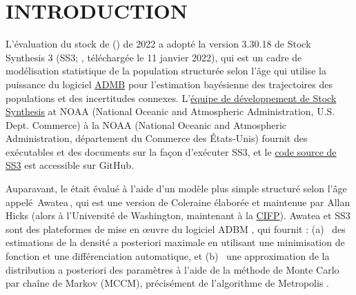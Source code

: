 \documentclass[11pt]{book}
\newcommand{\angL}{\guillemotleft\,}
\newcommand{\angR}{\,\guillemotright}
\begin{document}
\newcommand{\LH}{}%
\newcommand{\RH}{}%
\newcommand{\LF}{\spn{} 2022}
\newcommand{\RF}{ANNEXE~\thechapter ~--\'{E}quations des mod\`{e}les}

\lhead{\LH}\rhead{\RH}\lfoot{\LF}\rfoot{\RF}

\newcommand{\nSims}{8\,000\,(pour la simulation de r\'{e}f\'{e}rence)\,/ 4\,000\,(pour les analyses de sensibilit\'{e})}
\newcommand{\nChains}{8}
\newcommand{\cSims}{1\,000\,(base)\,/ 500\,(sens)}
\newcommand{\cBurn}{750\,(base)\,/ 250\,(sens)}
\newcommand{\cSamps}{250}
\newcommand{\Nmcmc}{2\,000}
\newcommand{\Nbase}{2\,000}

\newcommand{\harvestMax}{0,401}
\newcommand{\harvestInc}{0,001}
\newcommand{\policyMax}{2000}
\newcommand{\policyInc}{250}
\newcommand{\currYear}{2023} %
\newcommand{\prevYear}{2022} %
\newcommand{\projYear}{2033} %

\section{INTRODUCTION}%

L'\'{e}valuation du stock de \spn{} (\spc) de 2022 a adopt\'{e} la version 3.30.18 de Stock Synthesis 3 (SS3; \citealt{Methot-etal:2021}, t\'{e}l\'{e}charg\'{e}e le 11 janvier 2022), qui est un cadre de mod\'{e}lisation statistique de la population structur\'{e}e selon l'\^{a}ge \citep{Methot-Wetzel:2013} qui utilise la puissance du logiciel \href{https://www.admb-project.org/}{ADMB} pour l'estimation bay\'{e}sienne des trajectoires des populations et des incertitudes connexes.
L'\href{https://vlab.noaa.gov/web/stock-synthesis}{\'{e}quipe de d\'{e}veloppement de Stock Synthesis} at NOAA (National Oceanic and Atmospheric Administration, U.S. Dept. Commerce) \`{a} la NOAA (National Oceanic and Atmospheric Administration, d\'{e}partement du Commerce des \'{E}tats-Unis) fournit des ex\'{e}cutables et des documents sur la fa\c{c}on d'ex\'{e}cuter SS3, et le \href{https://github.com/nmfs-stock-synthesis/stock-synthesis}{code source de SS3} est accessible sur GitHub.

Auparavant, le \spc{} \'{e}tait \'{e}valu\'{e} \`{a} l'aide d'un mod\`{e}le plus simple structur\'{e} selon l'\^{a}ge appel\'{e} \angL{}Awatea\angR{}, qui est une version de Coleraine \citep{Hilborn-etal:2003} \'{e}labor\'{e}e et maintenue par Allan Hicks (alors \`{a} l'Universit\'{e} de Washington, maintenant \`{a} la \href{https://www.iphc.int/}{CIFP}).
Awatea et SS3 sont des plateformes de mise en {\oe}uvre du logiciel ADBM \citep{ADMB:2009}, qui fournit : (a)~ des estimations de la densit\'{e} a posteriori maximale en utilisant une minimisation de fonction et une diff\'{e}renciation automatique, et (b)~ une approximation de la distribution a posteriori des param\`{e}tres \`{a} l'aide de la m\'{e}thode de Monte Carlo par cha\^{i}ne de Markov (MCCM), pr\'{e}cis\'{e}ment de l'algorithme de Metropolis \citep{Gelman-etal:2004}.
\end{document}
